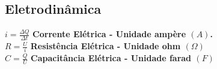 \documentclass[
    12pt, %
    openright,
    twoside, %
    a4paper, %
    article,
    english,brazil %
]{abntex2}
\begin{document}
\subsection{Eletrodinâmica}

$i = \frac{\Delta Q}{\Delta t}$ \quad \textbf{Corrente Elétrica - Unidade ampère $(A)$.}\\
$R = \frac{U}{i}$ \quad \textbf{Resistência Elétrica - Unidade ohm $(\Omega)$} \\
$C = \frac{Q}{U}$ \quad \textbf{Capacitância Elétrica - Unidade farad $(F)$} \\
\end{document}
